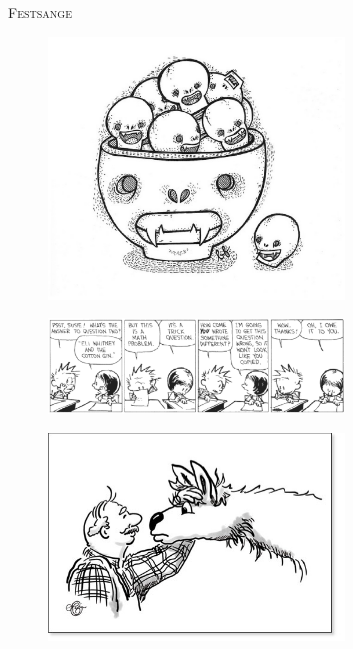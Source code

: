 \begin{center}
{\Huge\textsc{Festsange}}
\end{center}
\begin{figure}[h!]
  \centering
    \includegraphics[width=0.7\textwidth]{images/party.eps}
\end{figure}
\newpage

\begin{figure}[hb!]
  \centering
    \includegraphics[width=0.7\textwidth]{images/calvinanswer.eps}
\end{figure}
\newpage

\newpage

\begin{figure}[h!]
  \centering
    \includegraphics[width=0.7\textwidth]{images/bondemand.eps}
\end{figure}
